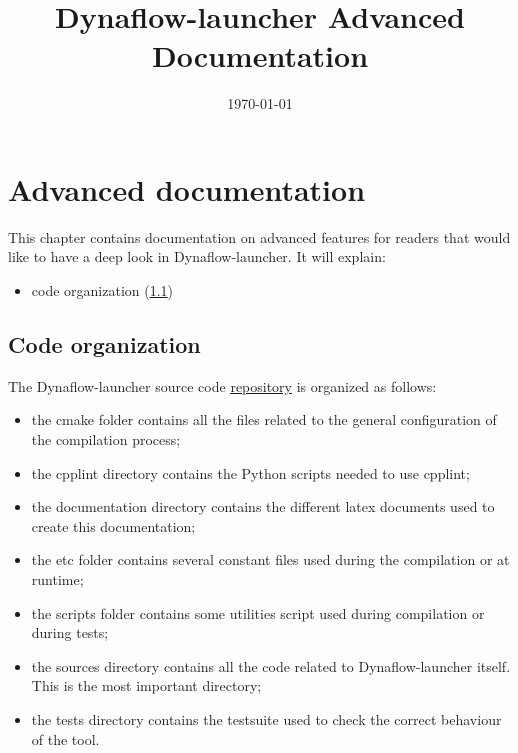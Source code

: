\documentclass[a4paper, 12pt]{report}
\begin{document}
\title{Dynaflow-launcher Advanced Documentation}
\date\today

\maketitle
\tableofcontents

\chapter{Advanced documentation}

This chapter contains documentation on advanced features for readers that would like to have a deep look in Dynaflow-launcher.
It will explain:
\begin{itemize}
\item \Dynawo code organization (\ref{Dynaflow_Launcher_Advanced_Documentation_Code_Organization})
\end{itemize}

\section{Code organization}
\label{Dynaflow_Launcher_Advanced_Documentation_Code_Organization}

The Dynaflow-launcher source code \href{https://github.com/dynawo/dynaflow-launcher.git}
{\underline{repository}} is organized as follows:
\begin{itemize}
\item the cmake folder contains all the files related to the general
configuration of the compilation process;
\item the cpplint directory contains the Python scripts needed to use cpplint;
\item the documentation directory contains the different latex documents used to
create this documentation;
\item the etc folder contains several constant files used during the compilation or at runtime;
\item the scripts folder contains some utilities script used during compilation or during tests;
\item the sources directory contains all the code related to Dynaflow-launcher itself. This is the most important directory;
\item the tests directory contains the testsuite used to check the correct
behaviour of the tool.
\end{itemize}
\end{document}
